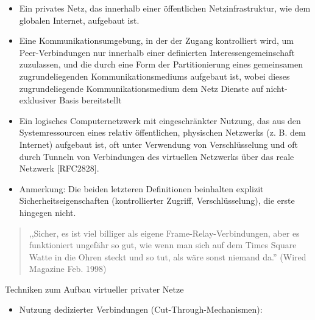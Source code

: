 \documentclass[a4paper]{article}
\begin{document}
\begin{multicols}{3}
\begin{itemize}
              \begin{itemize}
                  \item
                        Ein privates Netz, das innerhalb einer öffentlichen
                        Netzinfrastruktur, wie dem globalen Internet, aufgebaut ist.
                  \item
                        Eine Kommunikationsumgebung, in der der Zugang kontrolliert wird, um
                        Peer-Verbindungen nur innerhalb einer definierten
                        Interessengemeinschaft zuzulassen, und die durch eine Form der
                        Partitionierung eines gemeinsamen zugrundeliegenden
                        Kommunikationsmediums aufgebaut ist, wobei dieses zugrundeliegende
                        Kommunikationsmedium dem Netz Dienste auf nicht-exklusiver Basis
                        bereitstellt
                  \item
                        Ein logisches Computernetzwerk mit eingeschränkter Nutzung, das aus
                        den Systemressourcen eines relativ öffentlichen, physischen
                        Netzwerks (z. B. dem Internet) aufgebaut ist, oft unter Verwendung
                        von Verschlüsselung und oft durch Tunneln von Verbindungen des
                        virtuellen Netzwerks über das reale Netzwerk {[}RFC2828{]}.
                  \item
                        Anmerkung: Die beiden letzteren Definitionen beinhalten explizit
                        Sicherheitseigenschaften (kontrollierter Zugriff, Verschlüsselung),
                        die erste hingegen nicht.
              \end{itemize}
    \end{itemize}

    \begin{quote}
        ,,Sicher, es ist viel billiger als eigene Frame-Relay-Verbindungen, aber
        es funktioniert ungefähr so gut, wie wenn man sich auf dem Times Square
        Watte in die Ohren steckt und so tut, als wäre sonst niemand da.''
        (Wired Magazine Feb. 1998)
    \end{quote}

    Techniken zum Aufbau virtueller privater Netze

    \begin{itemize}
        \item
              Nutzung dedizierter Verbindungen (Cut-Through-Mechanismen):


\end{itemize}
\end{multicols}
\end{document}
